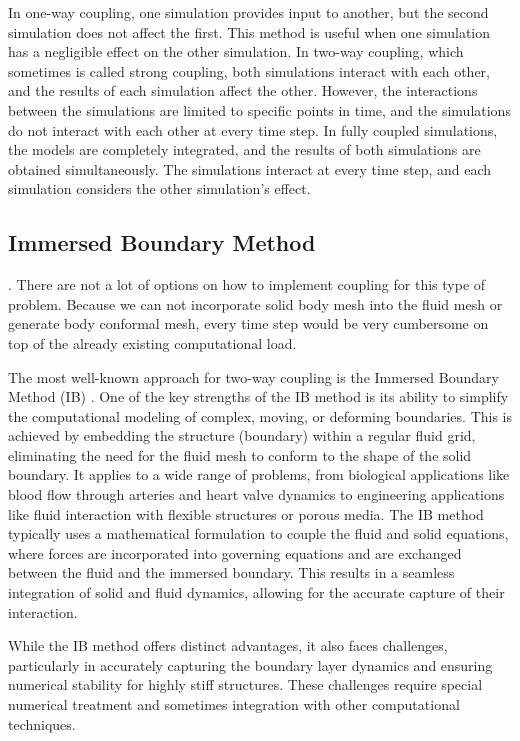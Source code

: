In one-way coupling, one simulation provides input to another, but the second simulation does not affect the first. This method is useful when one simulation has a negligible effect on the other simulation. In two-way coupling, which sometimes is called strong coupling, both simulations interact with each other, and the results of each simulation affect the other. However, the interactions between the simulations are limited to specific points in time, and the simulations do not interact with each other at every time step. In fully coupled simulations, the models are completely integrated, and the results of both simulations are obtained simultaneously. The simulations interact at every time step, and each simulation considers the other simulation's effect.

\subsection{Immersed Boundary Method}.
There are not a lot of options on how to implement coupling for this type of problem. Because we can not incorporate solid body mesh into the fluid mesh or generate body conformal mesh, every time step would be very cumbersome on top of the already existing computational load. 

The most well-known approach for two-way coupling is the Immersed Boundary Method (\ac{IB}) \cite{mittal2005immersed}. One of the key strengths of the IB method is its ability to simplify the computational modeling of complex, moving, or deforming boundaries. This is achieved by embedding the structure (boundary) within a regular fluid grid, eliminating the need for the fluid mesh to conform to the shape of the solid boundary. It applies to a wide range of problems, from biological applications like blood flow through arteries and heart valve dynamics to engineering applications like fluid interaction with flexible structures or porous media. The IB method typically uses a mathematical formulation to couple the fluid and solid equations, where forces are incorporated into governing equations and are exchanged between the fluid and the immersed boundary. This results in a seamless integration of solid and fluid dynamics, allowing for the accurate capture of their interaction. 

While the IB method offers distinct advantages, it also faces challenges, particularly in accurately capturing the boundary layer dynamics and ensuring numerical stability for highly stiff structures. These challenges require special numerical treatment and sometimes integration with other computational techniques. 

